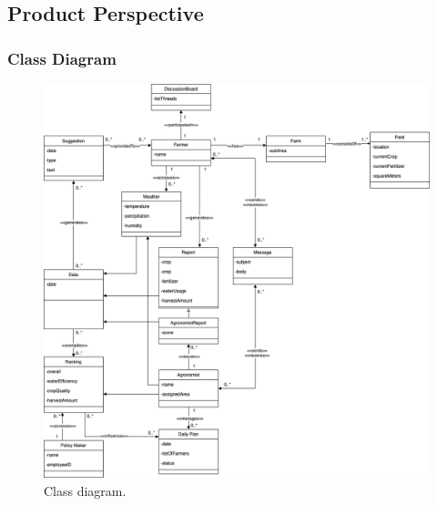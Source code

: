 \subsection{Product Perspective}

\subsubsection{Class Diagram}

\begin{figure}[bht!]
\centering
\includegraphics[scale=0.35]{../images_diagrams/class_diagram.drawio.png}
\caption{\label{fig:classdiagram}Class diagram.}
\end{figure}

